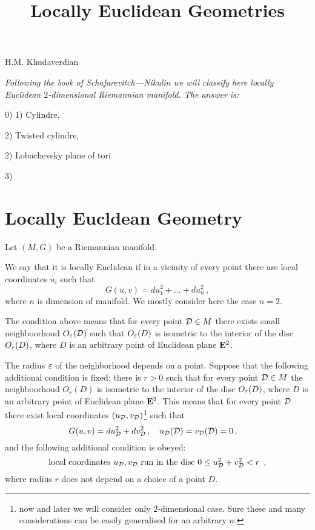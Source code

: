 \documentclass[12pt]{article}
\title{Locally Euclidean Geometries}
\date{}
\theoremstyle{theorem}
\theoremstyle{lemma}
\numberwithin{equation}{section}
\begin{document}
\maketitle

 \centerline {H.M. Khudaverdian}



 {\it Following the book of Schafarevitch---Nikulin we will classify here
  locally Euclidean $2$-dimensional Riemannian manifold.   The answer is:

   0)
 1)  Cylindre,

  2)   Twisted cylindre, 

 2) Lobachevsky plane of tori

 3)  



}

\section {Locally Eucldean Geometry}
\label{localeuclidgeometry}

 Let $(M,G)$ be a Riemannian manifold.

  We say that it is locally Euclidean if 
in a vicinity of every point there are 
local coordinates  $u_i$ such that
      \begin{equation*}
     G(u,v)=du_1^2+\dots+du_n^2\,,
        \end{equation*}
where $n$  is dimension of manifold. We mostly consider here
  the case $n=2$.

The condition above means that
for every point ${\cal D}\in M$ there exists small
neighboorhoud $O_{\varepsilon}({\cal D})$  such that $O_{\varepsilon}(D)$
is isometric to the interior of the disc $O_{\varepsilon}(D)$,
where $D$ is an arbitrary point of Euclidean plane ${\bf E}^2$. 

  The radius ${\varepsilon}$ of the neighborhood depends on a point.
Suppose that the following additional condition 
is fixed:
there is $r>0$ such that 
for every point ${\cal D}\in M$ the
neighboorhoud $O_r(D)$
is isometric to the interior of the disc $O_{\varepsilon}(D)$,
where $D$ is an arbitrary point 
of Euclidean plane ${\bf E}^2$. 
This means that for every 
point  ${\cal D}$ there exist local
coordinates
  $(u_{\cal D},v_{\cal D})$\footnote{now and later we will consider only 
$2$-dimensional case.  Sure these 
and many considerations can
be easily generalised for an arbitrary $n$.} such that
      \begin{equation}\label{loceuclid}
     G(u,v)=du_{\cal D}^2+dv_{\cal D}^2\,,\quad
    u_{\cal D}({\cal D})=v_{\cal D}({\cal D})=0\,,\quad
         \end{equation}
and the following additional condition is obeyed:
         \begin{equation}\label{stronglyloceuclid}
\hbox {local coordinates $u_{\cal D},v_{\cal D}$ run 
in the disc $0\leq u_{\cal D}^2+v_{\cal D}^2<r $ }\,,   
        \end{equation}
where radius $r$ does not depend on
a choice of a point $D$.
\end{document}
